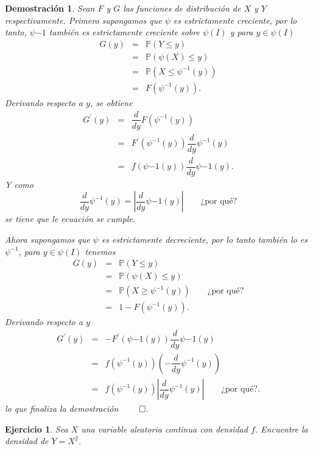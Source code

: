 \documentclass[11pt]{report}
\theoremstyle{break}
\newtheorem*{demostracion}{Demostración}
\newtheorem{ejercicio}{Ejercicio}[chapter]
\theoremstyle{break}
\begin{document}
\begin{demostracion}
Sean $F$ y $G$ las funciones de distribución de $X$ y $Y$ respectivamente. Primero supongamos que $\psi$ es estrictamente creciente, por lo tanto, $\psi{-1}$ también es estrictamente creciente sobre $\psi(I)$ y para $y \in \psi(I)$
$$
\begin{array}{lll}
G(y) & = & \mathbb{P}(Y \leq y)\\
 & = & \mathbb{P}(\psi(X) \leq y) \\
 & = & \mathbb{P}(X \leq \psi^{-1}(y))\\
 & = & F(\psi^{-1}(y)).
\end{array}
$$
Derivando respecto a $y$, se obtiene
$$
\begin{array}{lll}
G^{'}(y) & = & \dfrac{d}{dy}F(\psi^{-1}(y))\\
& = & F^{'}(\psi^{-1}(y))\dfrac{d}{dy}\psi^{-1}(y)\\
& = & f(\psi{-1}(y))\dfrac{d}{dy}\psi{-1}(y).
\end{array}
$$
Y como
$$
\dfrac{d}{dy}\psi^{-1}(y) = \left| \dfrac{d}{dy}\psi{-1}(y) \right| \qquad \mbox{¿por qué?}
$$
se tiene que le ecuación se cumple.

Ahora supongamos que $\psi$ es estrictamente decreciente, por lo tanto también lo es $\psi^{-1}$, para $y \in \psi(I)$ tenemos
$$
\begin{array}{lcl}
G(y) & = & \mathbb{P}(Y \leq y) \\
& = & \mathbb{P}(\psi(X) \leq y) \\
& = & \mathbb{P}(X \geq \psi^{-1}(y)) \qquad \mbox{¿por qué?} \\
& = & 1 - F(\psi^{-1}(y)).
\end{array}
$$
Derivando respecto a $y$
$$
\begin{array}{lcl}
G^{'}(y) & = & -F^{'}(\psi{-1}(y))\dfrac{d}{dy}\psi{-1}(y)\\
& = & f(\psi^{-1}(y))\left( - \dfrac{d}{dy} \psi^{-1}(y)  \right) \\
 & = & f(\psi^{-1}(y))\left| \dfrac{d}{dy} \psi^{-1}(y)  \right| \qquad \mbox{¿por qué?}. 
\end{array}
$$
lo que finaliza la demostración $\qed$.
\end{demostracion}

\begin{ejercicio}
Sea $X$ una variable aleatoria continua con densidad $f$. Encuentre la densidad de $Y = X^2$.
\end{ejercicio}
\end{document}
